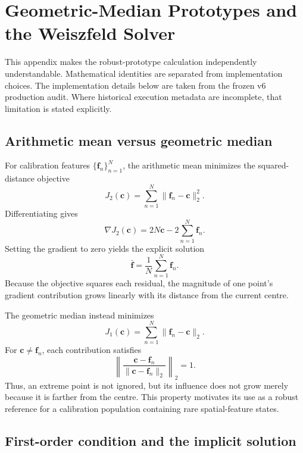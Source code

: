 \clearpage
\section{Geometric-Median Prototypes and the Weiszfeld Solver}
\label{sec:kdgrp-weiszfeld-appendix}

This appendix makes the robust-prototype calculation independently
understandable. Mathematical identities are separated from implementation
choices. The implementation details below are taken from the frozen v6
production audit. Where historical execution metadata are incomplete, that
limitation is stated explicitly.

\subsection{Arithmetic mean versus geometric median}

For calibration features $\{\bm f_n\}_{n=1}^{N}$, the arithmetic mean minimizes
the squared-distance objective
\begin{equation}
    J_2(\bm c)=\sum_{n=1}^{N}\|\bm f_n-\bm c\|_2^2.
\end{equation}
Differentiating gives
\begin{equation}
    \nabla J_2(\bm c)
    =2N\bm c-2\sum_{n=1}^{N}\bm f_n.
\end{equation}
Setting the gradient to zero yields the explicit solution
\begin{equation}
    \bar{\bm f}=\frac{1}{N}\sum_{n=1}^{N}\bm f_n.
\end{equation}
Because the objective squares each residual, the magnitude of one point's
gradient contribution grows linearly with its distance from the current centre.

The geometric median instead minimizes
\begin{equation}
    J_1(\bm c)=\sum_{n=1}^{N}\|\bm f_n-\bm c\|_2.
\end{equation}
For $\bm c\neq\bm f_n$, each contribution satisfies
\begin{equation}
    \left\|
    \frac{\bm c-\bm f_n}{\|\bm c-\bm f_n\|_2}
    \right\|_2=1.
\end{equation}
Thus, an extreme point is not ignored, but its influence does not grow merely
because it is farther from the centre. This property motivates its use as a
robust reference for a calibration population containing rare spatial-feature
states.

\subsection{First-order condition and the implicit solution}

